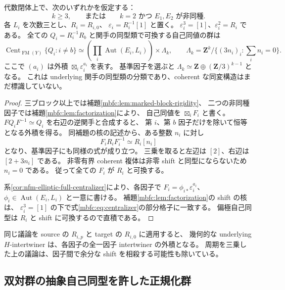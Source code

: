 \begin{proposition}
\label{mbfc:prop:centralizer}
代数閉体上で、次のいずれかを仮定する：
\begin{equation}\label{mbfc:eq:block-hypothesis}
 k\ge3,\qquad\text{または}\qquad k=2\text{ かつ }E_1,E_2\text{ が非同種}.
\end{equation}
各 $L_i$ を次数三とし、$R_i=R_{i,0}$、
$\varepsilon_i=R_i^{-1}[1]$ と置く。
$\varepsilon_i^3=[1]$、$\varepsilon_i^2=R_i$ である。
全ての $Q_i=R_i^{-1}R_b$ と関手の同型類で可換する自己同値の群は
\begin{equation}\label{mbfc:eq:centralizer}
 \operatorname{Cent}_{\operatorname{FM}(Y)}\{Q_i:i\ne b\}
 \simeq
 \left(\prod_i\operatorname{Aut}(E_i,L_i)\right)\times\Lambda_k,
 \qquad
 \Lambda_k=\mathbf Z^k/
       \{(3n_i)_i:\sum_i n_i=0\}.
\end{equation}
ここで $(a_i)$ は外積 $\boxtimes_i\varepsilon_i^{a_i}$ を表す。
基準因子を選ぶと $\Lambda_k\simeq\mathbf Z\oplus(\mathbf Z/3)^{k-1}$ となる。
これは underlying 関手の同型類の分類であり、coherent な同変構造はまだ標識していない。
\end{proposition}
\begin{proof}
三ブロック以上では補題\ref{mbfc:lem:marked-block-rigidity}、
二つの非同種因子では補題\ref{mbfc:lem:factorization}により、
自己同値を $\boxtimes_i F_i$ と書く。
$FQ_iF^{-1}\simeq Q_i$ を右辺の逆関手と合成すると、
第 $i$、第 $b$ 因子だけを除いて恒等となる外積を得る。
同補題の核の記述から、ある整数 $n_i$ に対し
\[
 F_iR_iF_i^{-1}\simeq R_i[n_i]
\]
となり、基準因子にも同様の式が成り立つ。
三乗を取ると左辺は $[2]$、右辺は $[2+3n_i]$ である。
非零有界 coherent 複体は非零 shift と同型にならないため $n_i=0$ である。
従って全ての $F_i$ が $R_i$ と可換する。

系\ref{cor:nfm-elliptic-full-centralizer}により、各因子で
$F_i=\phi_{i*}\varepsilon_i^{a_i}$、
$\phi_i\in\operatorname{Aut}(E_i,L_i)$ と一意に書ける。
補題\ref{mbfc:lem:factorization}の shift の核は、
$\varepsilon_i^3=[1]$ の下で式\eqref{mbfc:eq:centralizer}の部分格子に一致する。
偏極自己同型は $R_i$ と shift に可換するので直積である。
\end{proof}

同じ議論を source の $R_{i,p}$ と target の $R_{i,0}$ に適用すると、
幾何的な underlying $H$-intertwiner は、各因子の全一因子 intertwiner の外積となる。
周期を三乗した上の議論は、因子間で余分な shift を相殺する可能性も除いている。

\subsection{双対群の抽象自己同型を許した正規化群}

